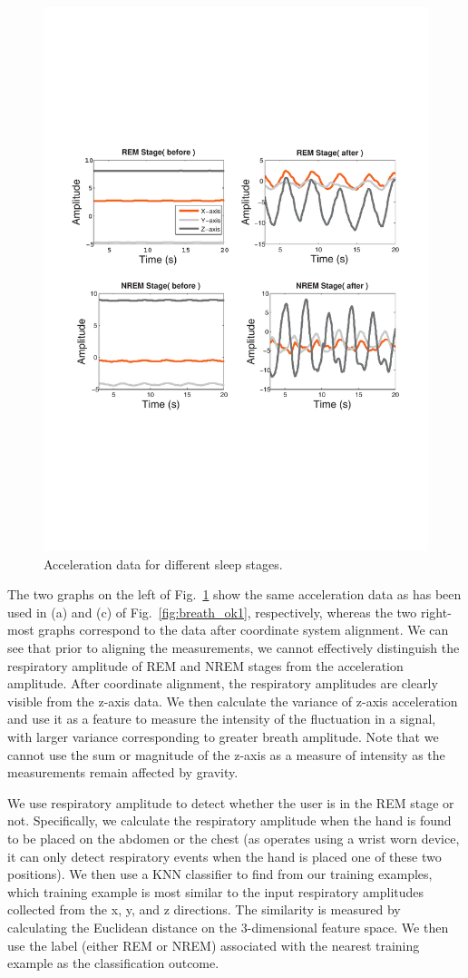  \begin{figure}[!t]
\centering
      \includegraphics[width=0.75\linewidth]{Figures/cordi.pdf}
  \caption{Acceleration data for different sleep stages.}\label{fig:cordi}
\end{figure}

The two graphs on the left of Fig.~\ref{fig:cordi} show the same acceleration data as has been used in (a) and (c) of
Fig.~\ref{fig:breath_ok1}, respectively, whereas the two right-most graphs correspond to the data after coordinate system alignment.  We
can see that prior to aligning the measurements, we cannot effectively distinguish the respiratory amplitude of REM and NREM stages from the
acceleration amplitude. After coordinate alignment, the respiratory amplitudes are clearly visible from the z-axis data. We then calculate
the variance of z-axis acceleration and use it as a feature to measure the intensity of the fluctuation in a signal, with larger variance
corresponding to greater breath amplitude. Note that we cannot use the sum or magnitude of the z-axis as a measure of intensity as the
measurements remain affected by gravity.

 We use respiratory amplitude to detect whether the user is in the REM stage or not. Specifically, we calculate the
respiratory amplitude when the hand is found to be placed on the abdomen or the chest (as \systemname operates using a wrist worn device, it can only detect respiratory events when
the hand is placed one of these two positions). We then use a KNN classifier to find from our training examples, which training example is
most similar to the input respiratory amplitudes collected from the x, y, and z directions. The similarity is measured by calculating the
Euclidean distance on the 3-dimensional feature space. We then use the label (either REM or NREM) associated with the nearest training
example as the classification outcome.

